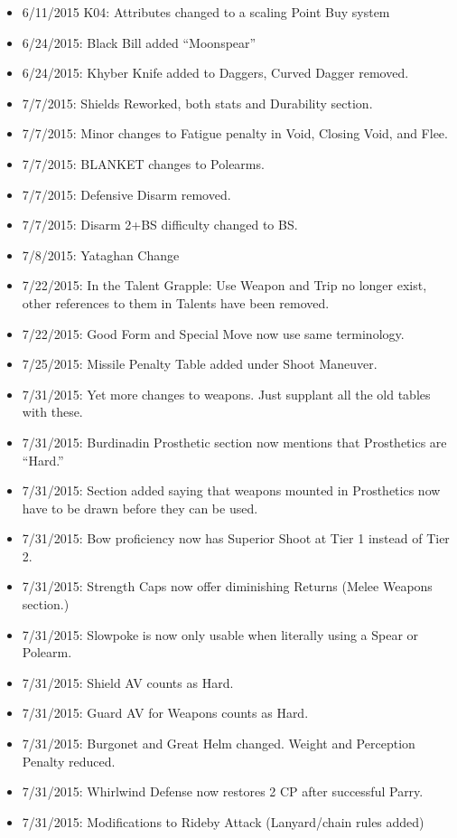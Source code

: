 \documentclass[oneside,11pt,english]{book}
\begin{document}
{\begin{itemize}
\item 6/11/2015 K04: Attributes changed to a scaling Point Buy system 
\item 6/24/2015: Black Bill added “Moonspear” 
\item 6/24/2015: Khyber Knife added to Daggers, Curved Dagger removed. 
\item 7/7/2015: Shields Reworked, both stats and Durability section. 
\item 7/7/2015: Minor changes to Fatigue penalty in Void, Closing Void, and Flee. 
\item 7/7/2015: BLANKET changes to Polearms. 
\item 7/7/2015: Defensive Disarm removed. 
\item 7/7/2015: Disarm 2+BS difficulty changed to BS. 
\item 7/8/2015: Yataghan Change 
\item 7/22/2015: In the Talent Grapple: Use Weapon and Trip no longer exist, other references to them in 
Talents have been removed. 
\item 7/22/2015: Good Form and Special Move now use same terminology. 
\item 7/25/2015: Missile Penalty Table added under Shoot Maneuver. 
\item 7/31/2015: Yet more changes to weapons. Just supplant all the old tables with these. 
\item 7/31/2015: Burdinadin Prosthetic section now mentions that Prosthetics are “Hard.” 
\item 7/31/2015: Section added saying that weapons mounted in Prosthetics now have to be drawn before they 
can be used. 
\item 7/31/2015: Bow proficiency now has Superior Shoot at Tier 1 instead of Tier 2. 
\item 7/31/2015: Strength Caps now offer diminishing Returns (Melee Weapons section.) 
\item 7/31/2015: Slowpoke is now only usable when literally using a Spear or Polearm. 
\item 7/31/2015: Shield AV counts as Hard. 
\item 7/31/2015: Guard AV for Weapons counts as Hard. 
\item 7/31/2015: Burgonet and Great Helm changed. Weight and Perception Penalty reduced. 
\item 7/31/2015: Whirlwind Defense now restores 2 CP after successful Parry.\ 
\item 7/31/2015: Modifications to Rideby Attack (Lanyard/chain rules added) 

\end{itemize}}
\end{document}
